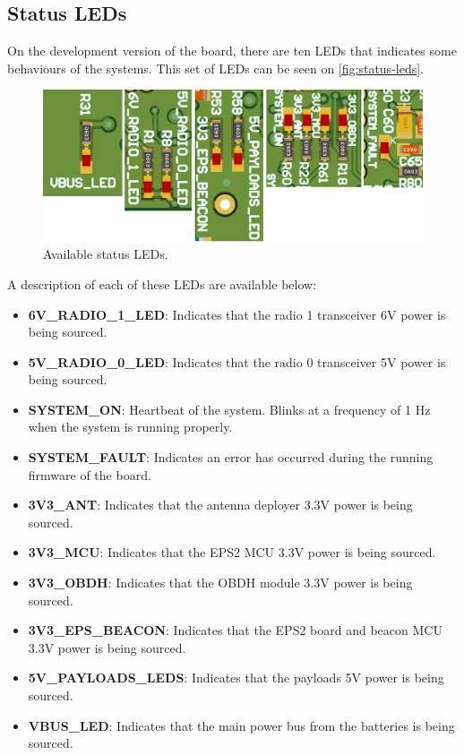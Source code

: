 \subsection{Status LEDs} \label{status-leds}

On the development version of the board, there are ten LEDs that indicates some behaviours of the systems. This set of LEDs can be seen on \autoref{fig:status-leds}.

\begin{figure}[!ht]
    \begin{center}
        \includegraphics[width=\textwidth]{figures/status_leds.png}
        \caption{Available status LEDs.}
        \label{fig:status-leds}
    \end{center}
\end{figure}

A description of each of these LEDs are available below:

\begin{itemize}
    \item \textbf{6V\_RADIO\_1\_LED}: Indicates that the radio 1 transceiver 6V power is being sourced.
    \item \textbf{5V\_RADIO\_0\_LED}: Indicates that the radio 0 transceiver 5V power is being sourced.
    \item \textbf{SYSTEM\_ON}: Heartbeat of the system. Blinks at a frequency of 1 Hz when the system is running properly.
    \item \textbf{SYSTEM\_FAULT}: Indicates an error has occurred during the running firmware of the board.
    \item \textbf{3V3\_ANT}: Indicates that the antenna deployer 3.3V power is being sourced.
    \item \textbf{3V3\_MCU}: Indicates that the EPS2 MCU 3.3V power is being sourced.
    \item \textbf{3V3\_OBDH}: Indicates that the OBDH module 3.3V power is being sourced.
    \item \textbf{3V3\_EPS\_BEACON}: Indicates that the EPS2 board and beacon MCU 3.3V power is being sourced.
    \item \textbf{5V\_PAYLOADS\_LEDS}: Indicates that the payloads 5V power is being sourced.
    \item \textbf{VBUS\_LED}: Indicates that the main power bus from the batteries is being sourced.
\end{itemize}

